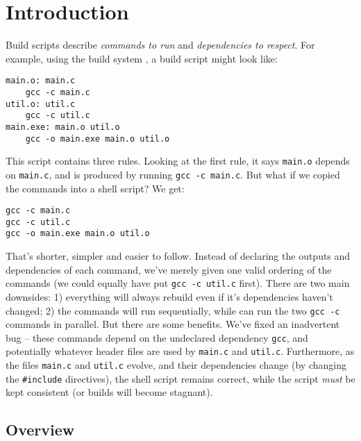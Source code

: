\section{Introduction}
\label{sec:introduction}

Build scripts \cite{build_systems_a_la_carte} describe \emph{commands to run} and \emph{dependencies to respect}. For example, using the \Make build system \cite{make}, a build script might look like:

\vspace{3mm}
\begin{verbatim}
main.o: main.c
    gcc -c main.c
util.o: util.c
    gcc -c util.c
main.exe: main.o util.o
    gcc -o main.exe main.o util.o
\end{verbatim}
\vspace{3mm}

This script contains three rules. Looking at the first rule, it says \texttt{main.o} depends on \texttt{main.c}, and is produced by running \texttt{gcc -c main.c}. But what if we copied the commands into a shell script? We get:

\vspace{3mm}
\begin{verbatim}
gcc -c main.c
gcc -c util.c
gcc -o main.exe main.o util.o
\end{verbatim}
\vspace{3mm}

That's shorter, simpler and easier to follow. Instead of declaring the outputs and dependencies of each command, we've merely given one valid ordering of the commands (we could equally have put \texttt{gcc -c util.c} first). There are two main downsides: 1) everything will always rebuild even if it's dependencies haven't changed; 2) the commands will run sequentially, while \Make can run the two \texttt{gcc -c} commands in parallel. But there are some benefits. We've fixed an inadvertent bug -- these commands depend on the undeclared dependency \texttt{gcc}, and potentially whatever header files are used by \texttt{main.c} and \texttt{util.c}. Furthermore, as the files \texttt{main.c} and \texttt{util.c} evolve, and their dependencies change (by changing the \texttt{\#include} directives), the shell script remains correct, while the \Make script \emph{must} be kept consistent (or builds will become stagnant).

\subsection{Overview}

